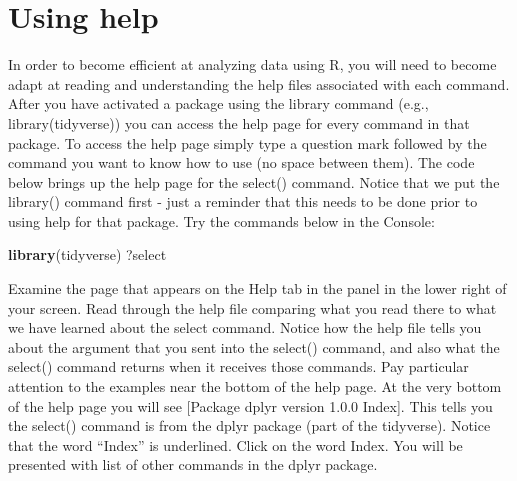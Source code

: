\documentclass[
]{krantz}
\makeatletter
\newenvironment{Shaded}{\begin{snugshade}}{\end{snugshade}}
\newcommand{\DataTypeTok}[1]{\textcolor[rgb]{0.27,0.27,0.27}{#1}}
\newcommand{\KeywordTok}[1]{\textcolor[rgb]{0.27,0.27,0.27}{\textbf{#1}}}
\newcommand{\NormalTok}[1]{#1}
\newcommand{\OperatorTok}[1]{\textcolor[rgb]{0.43,0.43,0.43}{\textbf{#1}}}
\newcommand{\StringTok}[1]{\textcolor[rgb]{0.5,0.5,0.5}{#1}}
\newenvironment{kframe}{%
\medskip{}
\setlength{\fboxsep}{.8em}
 \def\at@end@of@kframe{}%
 \ifinner\ifhmode%
  \def\at@end@of@kframe{\end{minipage}}%
  \begin{minipage}{\columnwidth}%
 \fi\fi%
 \def\FrameCommand##1{\hskip\@totalleftmargin \hskip-\fboxsep
 \colorbox{shadecolor}{##1}\hskip-\fboxsep
     \hskip-\linewidth \hskip-\@totalleftmargin \hskip\columnwidth}%
 \MakeFramed {\advance\hsize-\width
   \@totalleftmargin\z@ \linewidth\hsize
   \@setminipage}}%
 {\par\unskip\endMakeFramed%
 \at@end@of@kframe}
\renewenvironment{Shaded}{\begin{kframe}}{\end{kframe}}
\makeatother
\begin{document}
\begin{Shaded}
\end{Shaded}

\hypertarget{using-help}{%
\section{Using help}\label{using-help}}

In order to become efficient at analyzing data using R, you will need to become adapt at reading and understanding the help files associated with each command. After you have activated a package using the library command (e.g., library(tidyverse)) you can access the help page for every command in that package. To access the help page simply type a question mark followed by the command you want to know how to use (no space between them). The code below brings up the help page for the select() command. Notice that we put the library() command first - just a reminder that this needs to be done prior to using help for that package. Try the commands below in the Console:

\begin{Shaded}
\begin{Highlighting}[]
\KeywordTok{library}\NormalTok{(tidyverse)}
\NormalTok{?select}
\end{Highlighting}
\end{Shaded}

Examine the page that appears on the Help tab in the panel in the lower right of your screen. Read through the help file comparing what you read there to what we have learned about the select command. Notice how the help file tells you about the argument that you sent into the select() command, and also what the select() command returns when it receives those commands. Pay particular attention to the examples near the bottom of the help page. At the very bottom of the help page you will see {[}Package dplyr version 1.0.0 Index{]}. This tells you the select() command is from the dplyr package (part of the tidyverse). Notice that the word ``Index'' is underlined. Click on the word Index. You will be presented with list of other commands in the dplyr package.
\end{document}
